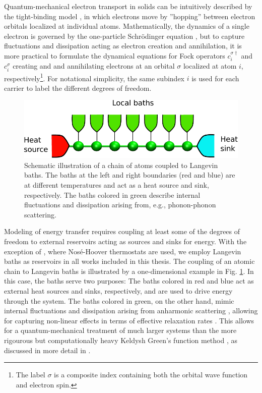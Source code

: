 Quantum-mechanical electron transport in solids can be intuitively described by the tight-binding model \cite{ashcroftmermin}, in which electrons move by ''hopping'' between electron orbitals localized at individual atoms. Mathematically, the dynamics of a single electron is governed by the one-particle Schr\"odinger equation \cite{griffiths_qm}, but to capture fluctuations and dissipation acting as electron creation and annihilation, it is more practical to formulate the dynamical equations for Fock operators $c_i^{\sigma\dagger}$ and $c_i^{\sigma}$ \cite{ballentine} creating and and annihilating electrons at an orbital $\sigma$ localized at atom $i$, respectively\footnote{The label $\sigma$ is a composite index containing both the orbital wave function and electron spin.}. For notational simplicity, the same subindex $i$ is used for each carrier to label the different degrees of freedom. 

\begin{figure}
 \begin{center}
 \includegraphics[width=.99\columnwidth]{pics/chain_baths.pdf}
 \caption{Schematic illustration of a chain of atoms coupled to Langevin baths. The baths at the left and right boundaries (red and blue) are at different temperatures and act as a heat source and sink, respectively. The baths colored in green describe internal fluctuations and dissipation arising from, e.g., phonon-phonon scattering.}
 \label{fig:langevin_chain}
  \end{center}
\end{figure}

Modeling of energy transfer requires coupling at least some of the degrees of freedom to external reservoirs acting as sources and sinks for energy. With the exception of , where Nos\'e-Hoover thermostats \cite{nose84} are used, we employ Langevin baths as reservoirs in all works included in this thesis. The coupling of an atomic chain to Langevin baths is illustrated by a one-dimensional example in Fig. \ref{fig:langevin_chain}. In this case, the baths serve two purposes: The baths colored in red and blue act as external heat sources and sinks, respectively, and are used to drive energy through the system. The baths colored in green, on the other hand, mimic internal fluctuations and dissipation arising from anharmonic scattering \cite{bolsterli70}, allowing for capturing non-linear effects in terms of effective relaxation rates \cite{bolsterli70}. This allows for a quantum-mechanical treatment of much larger systems than the more rigourous but computationally heavy Keldysh Green's function method \cite{haugjauho}, as discussed in more detail in . %

